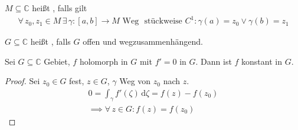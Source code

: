 \documentclass[a4paper,10pt]{scrbook}
\begin{document}
\begin{theorem}[Definition]
  \begin{enum-arab}
    \item $M \subseteq \mathbb{C}$ heißt , falls gilt
    \begin{align*}
      \forall \, z_0,z_1 \in M \, \exists \, \gamma:[a,b] \to M \text{ Weg } \text{ stückweise } C^1 : \gamma(a) = z_0 \lor \gamma(b) = z_1
    \end{align*}
    \item $G \subseteq \mathbb{C}$ heißt , falls $G$ offen und wegzusammenhängend.
  \end{enum-arab}
\end{theorem}

\begin{theorem}[Satz]
  Sei $G \subseteq \mathbb{C}$ Gebiet, $f$ holomorph in $G$ mit $f' = 0$ in $G$. Dann ist $f$ konstant in $G$.

  \begin{proof}
    Sei $z_0 \in G$ fest, $z \in G$, $\gamma$ Weg von $z_0$ nach $z$.
    \begin{gather*}
      0 = \int_{\gamma} f'(\zeta) \, \mathrm{d}\zeta = f(z) - f(z_0) \\
      \implies \forall \, z \in G : f(z) = f(z_0)
    \end{gather*}
  \end{proof}
\end{theorem}
\end{document}
